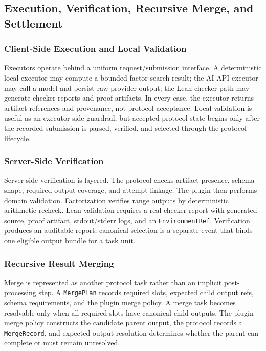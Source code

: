 \documentclass{article}
\theoremstyle{plain}
\begin{document}
\subsection{Execution, Verification, Recursive Merge, and Settlement}

\subsubsection{Client-Side Execution and Local Validation}

{\color{blue}
Executors operate behind a uniform request/submission interface. A deterministic local executor may compute a bounded factor-search result; the AI API executor may call a model and persist raw provider output; the Lean checker path may generate checker reports and proof artifacts. In every case, the executor returns artifact references and provenance, not protocol acceptance. Local validation is useful as an executor-side guardrail, but accepted protocol state begins only after the recorded submission is parsed, verified, and selected through the protocol lifecycle.
}

\subsubsection{Server-Side Verification}

{\color{blue}
Server-side verification is layered. The protocol checks artifact presence, schema shape, required-output coverage, and attempt linkage. The plugin then performs domain validation. Factorization verifies range outputs by deterministic arithmetic recheck. Lean validation requires a real checker report with generated source, proof artifact, stdout/stderr logs, and an \texttt{EnvironmentRef}. Verification produces an auditable report; canonical selection is a separate event that binds one eligible output bundle for a task unit.
}

\subsubsection{Recursive Result Merging}

{\color{blue}
Merge is represented as another protocol task rather than an implicit post-processing step. A \texttt{MergePlan} records required slots, expected child output refs, schema requirements, and the plugin merge policy. A merge task becomes resolvable only when all required slots have canonical child outputs. The plugin merge policy constructs the candidate parent output, the protocol records a \texttt{MergeRecord}, and expected-output resolution determines whether the parent can complete or must remain unresolved.
}
\end{document}
